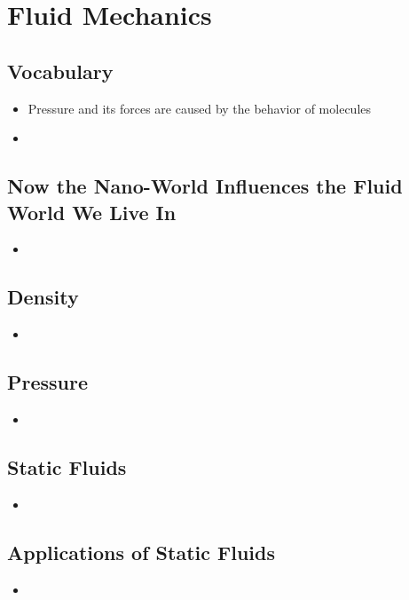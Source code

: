 \section{Fluid Mechanics}

\subsection{Vocabulary}
\begin{itemize}
    \item Pressure and its forces are caused by the behavior of molecules 
    \item 
\end{itemize}

\subsection{Now the Nano-World Influences the Fluid World We Live In}
\begin{itemize}
    \item 
\end{itemize}

\subsection{Density}
\begin{itemize}
    \item 
\end{itemize}

\subsection{Pressure}
\begin{itemize}
    \item 
\end{itemize}

\subsection{Static Fluids}
\begin{itemize}
    \item 
\end{itemize}

\subsection{Applications of Static Fluids}
\begin{itemize}
    \item 
\end{itemize}

